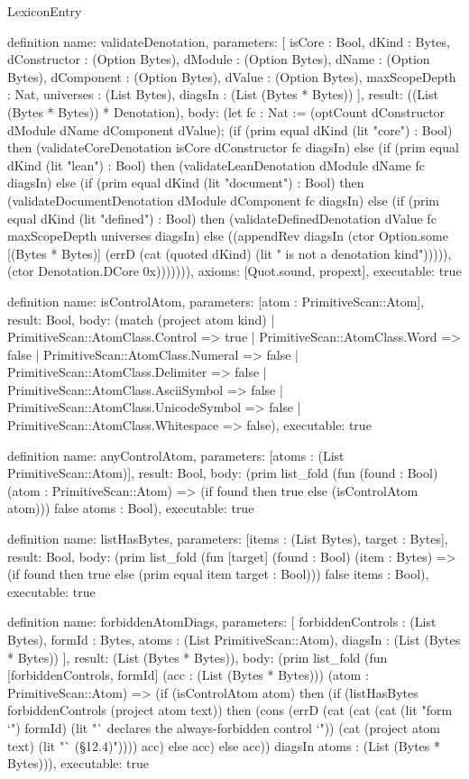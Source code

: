 \begin{lexlean}{LexiconEntry}
\begin{semanticmodule}
definition{
  name: validateDenotation,
  parameters: [
    isCore : Bool,
    dKind : Bytes,
    dConstructor : (Option Bytes),
    dModule : (Option Bytes),
    dName : (Option Bytes),
    dComponent : (Option Bytes),
    dValue : (Option Bytes),
    maxScopeDepth : Nat,
    universes : (List Bytes),
    diagsIn : (List (Bytes * Bytes))
  ],
  result: ((List (Bytes * Bytes)) * Denotation),
  body: (let fc : Nat := (optCount dConstructor dModule dName dComponent dValue); (if (prim equal dKind (lit "core") : Bool) then (validateCoreDenotation isCore dConstructor fc diagsIn) else (if (prim equal dKind (lit "lean") : Bool) then (validateLeanDenotation dModule dName fc diagsIn) else (if (prim equal dKind (lit "document") : Bool) then (validateDocumentDenotation dModule dComponent fc diagsIn) else (if (prim equal dKind (lit "defined") : Bool) then (validateDefinedDenotation dValue fc maxScopeDepth universes diagsIn) else ((appendRev diagsIn (ctor Option.some [(Bytes * Bytes)] (errD (cat (quoted dKind) (lit " is not a denotation kind"))))), (ctor Denotation.DCore 0x))))))),
  axioms: [Quot.sound, propext],
  executable: true
}

definition{
  name: isControlAtom,
  parameters: [atom : PrimitiveScan::Atom],
  result: Bool,
  body: (match (project atom kind)
    | PrimitiveScan::AtomClass.Control => true
    | PrimitiveScan::AtomClass.Word => false
    | PrimitiveScan::AtomClass.Numeral => false
    | PrimitiveScan::AtomClass.Delimiter => false
    | PrimitiveScan::AtomClass.AsciiSymbol => false
    | PrimitiveScan::AtomClass.UnicodeSymbol => false
    | PrimitiveScan::AtomClass.Whitespace => false),
  executable: true
}

definition{
  name: anyControlAtom,
  parameters: [atoms : (List PrimitiveScan::Atom)],
  result: Bool,
  body: (prim list_fold (fun (found : Bool) (atom : PrimitiveScan::Atom) => (if found then true else (isControlAtom atom))) false atoms : Bool),
  executable: true
}

definition{
  name: listHasBytes,
  parameters: [items : (List Bytes), target : Bytes],
  result: Bool,
  body: (prim list_fold (fun [target] (found : Bool) (item : Bytes) => (if found then true else (prim equal item target : Bool))) false items : Bool),
  executable: true
}

definition{
  name: forbiddenAtomDiags,
  parameters: [
    forbiddenControls : (List Bytes),
    formId : Bytes,
    atoms : (List PrimitiveScan::Atom),
    diagsIn : (List (Bytes * Bytes))
  ],
  result: (List (Bytes * Bytes)),
  body: (prim list_fold (fun [forbiddenControls, formId] (acc : (List (Bytes * Bytes))) (atom : PrimitiveScan::Atom) => (if (isControlAtom atom) then (if (listHasBytes forbiddenControls (project atom text)) then (cons (errD (cat (cat (cat (lit "form `") formId) (lit "` declares the always-forbidden control `")) (cat (project atom text) (lit "` (§12.4)")))) acc) else acc) else acc)) diagsIn atoms : (List (Bytes * Bytes))),
  executable: true
}


\end{semanticmodule}
\end{lexlean}
